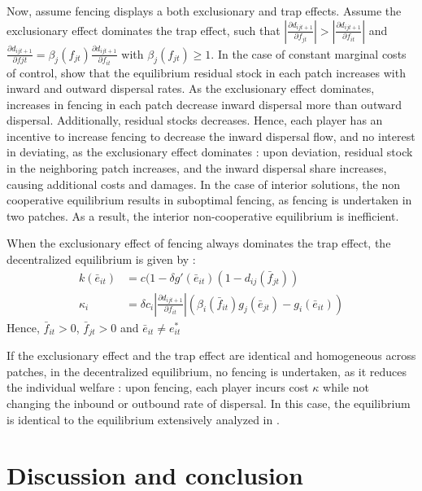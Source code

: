 Now, assume fencing displays a both exclusionary and trap effects. Assume the exclusionary effect dominates the trap effect, such that $\left|\frac{\partial d_{ijt+1}}{\partial f_{jt}}\right| > \left|\frac{\partial d_{ijt+1}}{\partial f_{it}}\right|$ and $\frac{\partial d_{ijt+1}}{\partial fjt} = \beta_j(f_{jt})\frac{\partial d_{ijt+1}}{\partial f_{it}}$ with $\beta_j(f_{jt})\geq 1$. In the case of constant marginal costs of control, \cite{costello_private_2017} show that the equilibrium residual stock in each patch increases with inward and outward dispersal rates. As the exclusionary effect dominates, increases in fencing in each patch decrease inward dispersal more than outward dispersal. Additionally, residual stocks decreases. Hence, each player has an incentive to increase fencing to decrease the inward dispersal flow, and no interest in deviating, as the exclusionary effect dominates : upon deviation, residual stock in the neighboring patch increases, and the inward dispersal share increases, causing additional costs and damages.
In the case of interior solutions, the non cooperative equilibrium results in suboptimal fencing, as fencing is undertaken in two patches. As a result, the interior non-cooperative equilibrium is inefficient. 

\begin{proposition}
When the exclusionary effect of fencing always dominates the trap effect, the decentralized equilibrium is given by : 
\begin{align}
k(\bar{e}_{it}) &= c(1 - \delta g'(\bar{e}_{it})(1 - d_{ij}(\bar{f}_{jt}))\\
\kappa_i  & = \delta c_i\left|\frac{\partial d_{ijt+1}}{\partial f_{it}}\right|(\beta_i(\bar{f}_{it})g_j(\bar{e}_{jt}) - g_i(\bar{e}_{it}))
\end{align}
Hence,  $\bar{f}_{it}>0$, $\bar{f}_{jt}>0$ and $\bar{e}_{it}\neq e^*_{it}$
\end{proposition}

If the exclusionary effect and the trap effect are identical and homogeneous across patches, in the decentralized equilibrium, no fencing is undertaken, as it reduces the individual welfare : upon fencing, each player incurs cost $\kappa$ while not changing the inbound or outbound rate of dispersal. In this case, the equilibrium is identical to the equilibrium extensively analyzed in \citep{costello_private_2017}.


\section{Discussion and conclusion}

